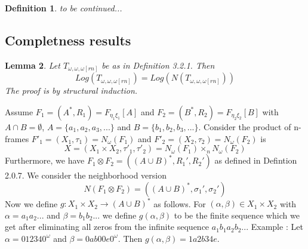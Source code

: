 \documentclass[12pt, a4paper]{scrartcl}
\newtheorem{definition}{Definition}[subsection]
\newtheorem{lemma}[definition]{Lemma}
\begin{document}
\begin{definition}
    to be continued...
\end{definition}

\subsection{Completness results}

\begin{lemma}
    Let $T_{\omega,\omega,\omega[rn]}$ be as in Definition 3.2.1. Then 
    $$Log(T_{\omega,\omega,\omega[rn]}) = Log(N(T_{\omega,\omega,\omega[rn]}))$$ \newline
    The proof is by structural induction.

    
\end{lemma}

Assume $F_1 = (A^*,R_1) = F_{\eta_1 \xi_1}[A]$ and $F_2 = (B^*,R_2) = F_{\eta_2 \xi_2}[B]$ 
with $A \cap B = \emptyset$, $A = \{a_1,a_2,a_3,...\}$ and $B = \{b_1,b_2,b_3,...\}$. 
Consider the product of n-frames $F'_1 = (X_1, \tau_1) = N_\omega(F_1)$ and $F'_2 = (X_2, \tau_2) = N_\omega(F_2)$ is 
$$X = (X_1 \times X_2, \tau'_1, \tau'_2) = N_\omega(F_1) \times_n N_\omega(F_2)$$ \newline
Furthermore, we have $F_1 \otimes F_2 = ((A \cup B)^*, R_1', R_2')$ as defined in Defintion 2.0.7.
We consider the neighborhood version $$N(F_1 \otimes F_2) = ((A \cup B)^*, \sigma_1', \sigma_2')$$ \newline
Now we define $g : X_1 \times X_2 \rightarrow (A \cup B)^*$ as follows. For $(\alpha, \beta) \in X_1 \times X_2$ with $\alpha = a_1a_2...$ and $\beta = b_1b_2...$
we define $g(\alpha,\beta)$ to be the finite sequence which we get after eliminating all zeros from the infinite sequence
$a_1b_1a_2b_2...$ \newline \newline
Example : Let $\alpha = 012340^\omega$  and $\beta = 0ab00e0^\omega$. Then $g(\alpha, \beta) = 1a2b34e$.
\end{document}
